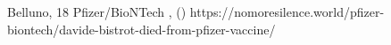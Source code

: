           {Belluno, }
          {18}
          {Pfizer/BioNTech}
          {}
          {
            ,
             ()
          }
          {https://nomoresilence.world/pfizer-biontech/davide-bistrot-died-from-pfizer-vaccine/}
